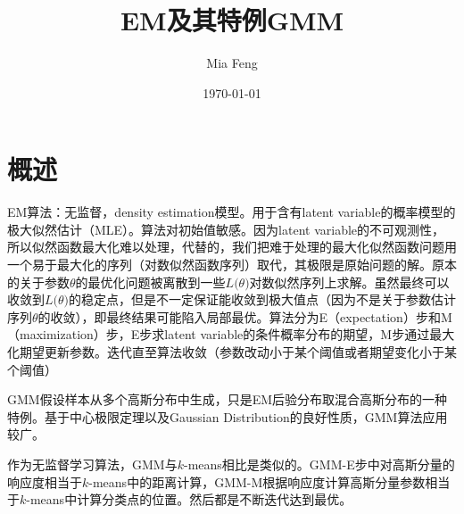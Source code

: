 \documentclass{ctexart}
\title{EM及其特例GMM} %
\author{Mia Feng} %
\date{\today} %
\begin{document}
\maketitle %




\section{概述}
EM算法：无监督，density estimation模型。用于含有latent variable的概率模型的极大似然估计（MLE）。算法对初始值敏感。因为latent variable的不可观测性，所以似然函数最大化难以处理，代替的，我们把难于处理的最大化似然函数问题用一个易于最大化的序列（对数似然函数序列）取代，其极限是原始问题的解。原本的关于参数$\theta$的最优化问题被离散到一些$L\big(\theta\big)$对数似然序列上求解。虽然最终可以收敛到$L\big(\theta\big)$的稳定点，但是不一定保证能收敛到极大值点（因为不是关于参数估计序列$\theta$的收敛），即最终结果可能陷入局部最优。算法分为E（expectation）步和M（maximization）步，E步求latent variable的条件概率分布的期望，M步通过最大化期望更新参数。迭代直至算法收敛（参数改动小于某个阈值或者期望变化小于某个阈值）

GMM假设样本从多个高斯分布中生成，只是EM后验分布取混合高斯分布的一种特例。基于中心极限定理以及Gaussian Distribution的良好性质，GMM算法应用较广。

作为无监督学习算法，GMM与$k$-means相比是类似的。GMM-E步中对高斯分量的响应度相当于$k$-means中的距离计算，GMM-M根据响应度计算高斯分量参数相当于$k$-means中计算分类点的位置。然后都是不断迭代达到最优\cite{gmm:kmeans}。
\end{document}
